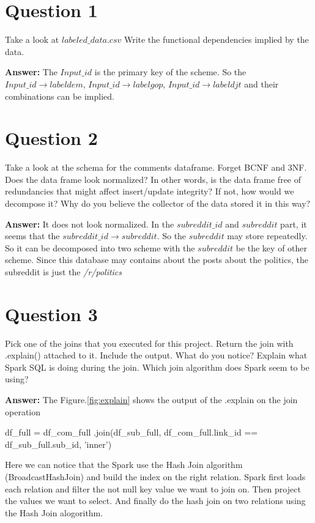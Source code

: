\documentclass[12pt]{article}
\begin{document}
\section {Question 1}

Take a look at $labeled\_data.csv$ Write the functional dependencies implied by the data.

\textbf {Answer:} The $Input\_id$ is the primary key of the scheme. So the $Input\_id \to labeldem$,  $Input\_id \to labelgop$, $Input\_id \to labeldjt$ and their combinations can be implied. 
\section {Question 2}
Take a look at the schema for the comments dataframe. Forget BCNF and 3NF. Does the data frame look normalized? In other words, is the data frame free of redundancies that might affect insert/update integrity? If not, how would we decompose it? Why do you believe the collector of the data stored it in this way?

\textbf{Answer:} It does not look normalized. In the $subreddit\_id$ and $subreddit$ part, it seems that the  $subreddit\_id \to subreddit$. So the $subreddit$ may store repeatedly. So it can be decomposed into two scheme with the $subreddit$ be the key of other scheme. Since this database may contains about the posts about the politics, the subreddit is just the \textit{/r/politics}


\section {Question 3}
Pick one of the joins that you executed for this project. Return the join with .explain() attached to it. Include the output. What do you notice? Explain what Spark SQL is doing during the join. Which join algorithm does Spark seem to be using?

\textbf{Answer:} The Figure.\ref{fig:explain} shows the output of the .explain on the join operation 
\begin{python}
df_full = df_com_full
	.join(df_sub_full, 
	df_com_full.link_id == df_sub_full.sub_id, 
	'inner')
\end{python}

Here we can notice that the Spark use the Hash Join algorithm (BroadcastHashJoin) and build the index on the right relation.  Spark first loads each relation and filter the not null key value we want to join on. Then project the values we want to select. And finally do the hash join on two relations using the Hash Join alogorithm.
\end{document}
